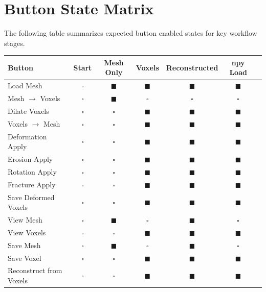 \documentclass[12pt,a4paper]{article}
\begin{document}
\section{Button State Matrix}

The following table summarizes expected button enabled states for key workflow stages.

\small
\begin{longtable}{lcccccc}
\toprule
\textbf{Button} & \textbf{Start} & \textbf{Mesh Only} & \textbf{Voxels} & \textbf{Reconstructed} & \textbf{npy Load} \\
\midrule
Load Mesh & $\square$ & $\blacksquare$ & $\blacksquare$ & $\blacksquare$ & $\blacksquare$ \\
Mesh $\rightarrow$ Voxels & $\square$ & $\blacksquare$ & $\square$ & $\square$ & $\square$ \\
Dilate Voxels & $\square$ & $\square$ & $\blacksquare$ & $\blacksquare$ & $\blacksquare$ \\
Voxels $\rightarrow$ Mesh & $\square$ & $\square$ & $\blacksquare$ & $\blacksquare$ & $\blacksquare$ \\
Deformation Apply & $\square$ & $\square$ & $\blacksquare$ & $\blacksquare$ & $\blacksquare$ \\
Erosion Apply & $\square$ & $\square$ & $\blacksquare$ & $\blacksquare$ & $\blacksquare$ \\
Rotation Apply & $\square$ & $\square$ & $\blacksquare$ & $\blacksquare$ & $\blacksquare$ \\
Fracture Apply & $\square$ & $\square$ & $\blacksquare$ & $\blacksquare$ & $\blacksquare$ \\
Save Deformed Voxels & $\square$ & $\square$ & $\blacksquare$ & $\blacksquare$ & $\blacksquare$ \\
View Mesh & $\square$ & $\blacksquare$ & $\square$ & $\blacksquare$ & $\square$ \\
View Voxels & $\square$ & $\square$ & $\blacksquare$ & $\blacksquare$ & $\blacksquare$ \\
Save Mesh & $\square$ & $\blacksquare$ & $\square$ & $\blacksquare$ & $\square$ \\
Save Voxel & $\square$ & $\square$ & $\blacksquare$ & $\blacksquare$ & $\blacksquare$ \\
Reconstruct from Voxels & $\square$ & $\square$ & $\blacksquare$ & $\blacksquare$ & $\blacksquare$ \\

\end{longtable}
\end{document}
